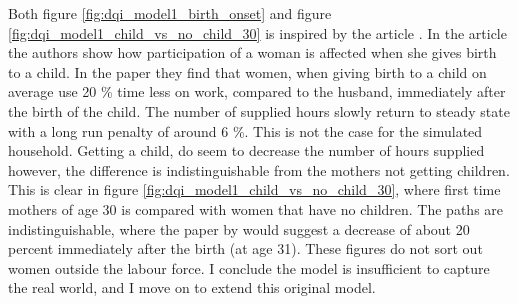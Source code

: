 Both figure \ref{fig:dqi_model1_birth_onset} and figure \ref{fig:dqi_model1_child_vs_no_child_30} is inspired by the article \parencite{kleven_children_2019}. In the article the authors show how participation of a woman is affected when she gives birth to a child. In the paper they find that women,  when giving birth to a child on average use 20 \% time less on work, compared to the husband, immediately after the birth of the child. The number of supplied hours slowly return to steady state with a long run penalty of around 6 \%. This is not the case for the simulated household. Getting a child, do seem to decrease the number of hours supplied however, the difference is indistinguishable from the mothers not getting children. This is clear in figure \ref{fig:dqi_model1_child_vs_no_child_30}, where first time mothers of age 30 is compared with women that have no children. The paths are indistinguishable, where the paper by \parencite{kleven_children_2019} would suggest a decrease of about 20 percent immediately after the birth (at age 31). These figures do not sort out women outside the labour force. I conclude the model is insufficient to capture the real world, and I move on to extend this original model.



